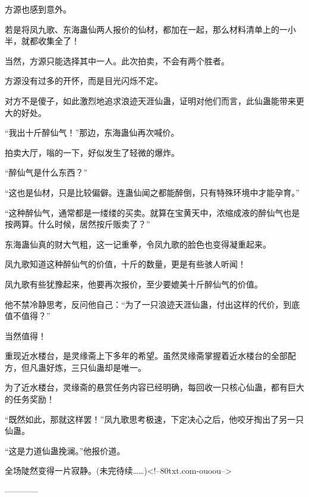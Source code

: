 \begin{this_body}
方源也感到意外。

若是将凤九歌、东海蛊仙两人报价的仙材，都加在一起，那么材料清单上的一小半，就都收集全了！

当然，方源只能选择其中一人。此次拍卖，不会有两个胜者。

方源没有过多的开怀，而是目光闪烁不定。

对方不是傻子，如此激烈地追求浪迹天涯仙蛊，证明对他们而言，此仙蛊能带来更大的好处。

“我出十斤醉仙气！”那边，东海蛊仙再次喊价。

拍卖大厅，嗡的一下，好似发生了轻微的爆炸。

“醉仙气是什么东西？”

“这也是仙材，只是比较偏僻。连蛊仙闻之都能醉倒，只有特殊环境中才能孕育。”

“这种醉仙气，通常都是一缕缕的买卖。就算在宝黄天中，浓缩成液的醉仙气也是按两算。什么时候，居然按斤贩卖了？”

东海蛊仙真的财大气粗，这一记重拳，令凤九歌的脸色也变得凝重起来。

凤九歌知道这种醉仙气的价值，十斤的数量，更是有些骇人听闻！

凤九歌有些犹豫起来，他要再次报价，至少要媲美十斤醉仙气的价值。

他不禁冷静思考，反问他自己：“为了一只浪迹天涯仙蛊，付出这样的代价，到底值不值得？”

当然值得！

重现近水楼台，是灵缘斋上下多年的希望。虽然灵缘斋掌握着近水楼台的全部配方，但凡蛊好炼，三只仙蛊却是唯一。

为了近水楼台，灵缘斋的悬赏任务内容已经明确，每回收一只核心仙蛊，都有巨大的任务奖励！

“既然如此，那就这样罢！”凤九歌思考极速，下定决心之后，他咬牙掏出了另一只仙蛊。

“这是力道仙蛊挽澜。”他报价道。

全场陡然变得一片寂静。(未完待续……)<!--80txt.com-ouoou-->

------------

\end{this_body}

